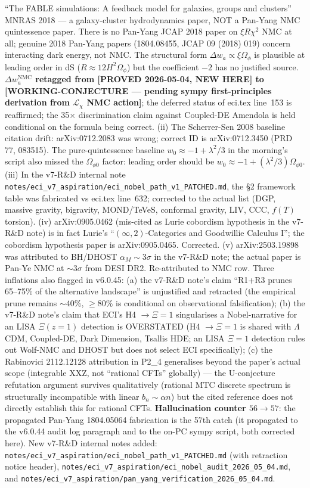 \documentclass[reprint,amsmath,amssymb,aps,prd,superscriptaddress]{revtex4-2}
\providecommand{\1}{\mathbf{1}}
\begin{document}
``The FABLE simulations: A feedback model for galaxies, groups and clusters'' MNRAS 2018 --- a galaxy-cluster hydrodynamics paper, NOT a Pan-Yang NMC quintessence paper. There is no Pan-Yang JCAP 2018 paper on $\xi R\chi^2$ NMC at all; genuine 2018 Pan-Yang papers (1804.08455, JCAP 09 (2018) 019) concern interacting dark energy, not NMC. The structural form $\Delta w_a \propto \xi\Omega_\phi$ is plausible at leading order in dS ($R \approx 12 H^2 \Omega_\phi$) but the coefficient $-2$ has no justified source. \textbf{$\Delta w_a^\mathrm{NMC}$ retagged from [PROVED 2026-05-04, NEW HERE] to [WORKING-CONJECTURE --- pending sympy first-principles derivation from $\mathcal{L}_\chi$ NMC action]}; the deferred status of eci.tex line~153 is reaffirmed; the 35$\times$ discrimination claim against Coupled-DE Amendola is held conditional on the formula being correct. (ii) The Scherrer-Sen 2008 baseline citation drift: arXiv:0712.2083 was wrong; correct ID is arXiv:0712.3450 (PRD 77, 083515). The pure-quintessence baseline $w_0 \approx -1 + \lambda^2/3$ in the morning's script also missed the $\Omega_{\phi 0}$ factor: leading order should be $w_0 \approx -1 + (\lambda^2/3)\Omega_{\phi 0}$. (iii) In the v7-R\&D internal note \texttt{notes/eci\_v7\_aspiration/eci\_nobel\_path\_v1\_PATCHED.md}, the \S2 framework table was fabricated vs eci.tex line~632; corrected to the actual list (DGP, massive gravity, bigravity, MOND/TeVeS, conformal gravity, LIV, CCC, $f(T)$ torsion). (iv) arXiv:0905.0462 (mis-cited as Lurie cobordism hypothesis in the v7-R\&D note) is in fact Lurie's ``$(\infty,2)$-Categories and Goodwillie Calculus I''; the cobordism hypothesis paper is arXiv:0905.0465. Corrected. (v) arXiv:2503.19898 was attributed to BH/DHOST $\alpha_M \sim 3\sigma$ in the v7-R\&D note; the actual paper is Pan-Ye NMC at $\sim 3\sigma$ from DESI DR2. Re-attributed to NMC row. Three inflations also flagged in v6.0.45: (a) the v7-R\&D note's claim ``R1+R3 prunes 65--75\% of the alternative landscape'' is unjustified and retracted (the empirical prune remains $\sim 40\%$, $\geq 80\%$ is conditional on observational falsification); (b) the v7-R\&D note's claim that ECI's H4 $\to \Xi=1$ singularises a Nobel-narrative for an LISA $\Xi(z=1)$ detection is OVERSTATED (H4 $\to \Xi=1$ is shared with $\Lambda$CDM, Coupled-DE, Dark Dimension, Tsallis HDE; an LISA $\Xi=1$ detection rules out Wolf-NMC and DHOST but does not select ECI specifically); (c) the Rabinovici 2112.12128 attribution in P2\_4 generalises beyond the paper's actual scope (integrable XXZ, not ``rational CFTs'' globally) --- the U-conjecture refutation argument survives qualitatively (rational MTC discrete spectrum is structurally incompatible with linear $b_n \sim \alpha n$) but the cited reference does not directly establish this for rational CFTs. \textbf{Hallucination counter $56 \to 57$}: the propagated Pan-Yang 1804.05064 fabrication is the 57th catch (it propagated to the v6.0.44 audit log paragraph and to the on-PC sympy script, both corrected here). New v7-R\&D internal notes added: \texttt{notes/eci\_v7\_aspiration/eci\_nobel\_path\_v1\_PATCHED.md} (with retraction notice header), \texttt{notes/eci\_v7\_aspiration/eci\_nobel\_audit\_2026\_05\_04.md}, and \texttt{notes/eci\_v7\_aspiration/pan\_yang\_verification\_2026\_05\_04.md}. 
\end{document}
